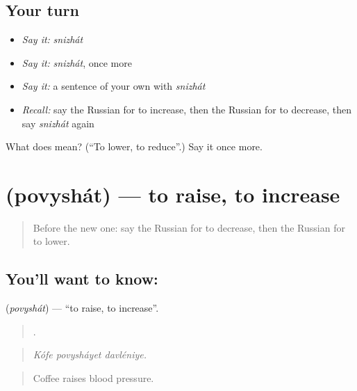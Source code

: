 \subsection*{Your turn}
\begin{itemize}
\raggedright
  \item \emph{Say it:} \emph{snizhát}
  \item \emph{Say it:} \emph{snizhát}, once more
  \item \emph{Say it:} a sentence of your own with \emph{snizhát}
  \item \emph{Recall:} say the Russian for to increase, then the Russian for to decrease, then say \emph{snizhát} again
\end{itemize}

\begin{tcolorbox}[breakable,colback=teal!4,colframe=teal!35!black,title={Before you move on}]
What does  mean? (\textquotedblleft{}To lower, to reduce\textquotedblright{}.) Say it once more.
\end{tcolorbox}
\section[\texorpdfstring{\ru{повышать} (povyshát)}{повышать (povyshát)}]{ (povyshát) — to raise, to increase}

\label{lesson:RU-C354-povyshat}



\begin{quote}
Before the new one: say the Russian for to decrease, then the Russian for to lower.
\end{quote}

\subsection*{You'll want to know: }
\textbf{} (\emph{povyshát}) — \textquotedblleft{}to raise, to increase\textquotedblright{}.

\begin{quote}
  .
\end{quote}

\begin{quote}
\emph{Kófe povysháyet davléniye.}
\end{quote}

\begin{quote}
Coffee raises blood pressure.
\end{quote}

